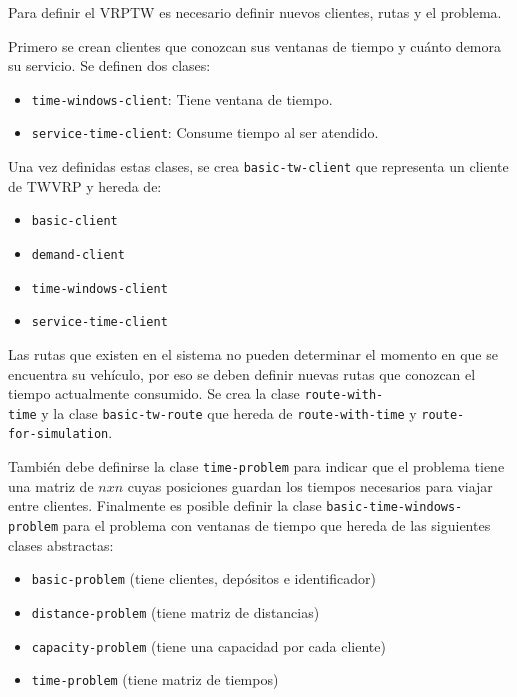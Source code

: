 Para definir el VRPTW es necesario definir nuevos clientes, rutas y el problema. 

Primero se crean clientes que conozcan sus ventanas de tiempo y cuánto demora su servicio. Se definen dos clases:

\begin{itemize}
	\item \texttt{time-windows-client}: Tiene ventana de tiempo.
	\item \texttt{service-time-client}: Consume tiempo al ser atendido. 
\end{itemize}

Una vez definidas estas clases, se crea \texttt{basic-tw-client} que representa un cliente de TWVRP y hereda de:

\begin{itemize}
	\item \texttt{basic-client}
	\item \texttt{demand-client}
	\item \texttt{time-windows-client}
	\item \texttt{service-time-client}
\end{itemize}

Las rutas que existen en el sistema no pueden determinar el momento en que se encuentra su vehículo, por eso se deben definir nuevas rutas que conozcan el tiempo actualmente consumido. Se crea la clase \texttt{route-with-\\time} y la clase \texttt{basic-tw-route} que hereda de \texttt{route-with-time} y \texttt{route-\\for-simulation}.

También debe definirse la clase \texttt{time-problem} para indicar que el problema tiene una matriz de $nxn$ cuyas posiciones guardan los tiempos necesarios para viajar entre clientes. Finalmente es posible definir la clase \texttt{basic-time-windows-problem} para el problema con ventanas de tiempo que hereda de las siguientes clases abstractas:

\begin{itemize}
	\item \texttt{basic-problem} (tiene clientes, depósitos e identificador)
	\item \texttt{distance-problem} (tiene matriz de distancias)
	\item \texttt{capacity-problem} (tiene una capacidad por cada cliente)
	\item \texttt{time-problem} (tiene matriz de tiempos)
\end{itemize}

